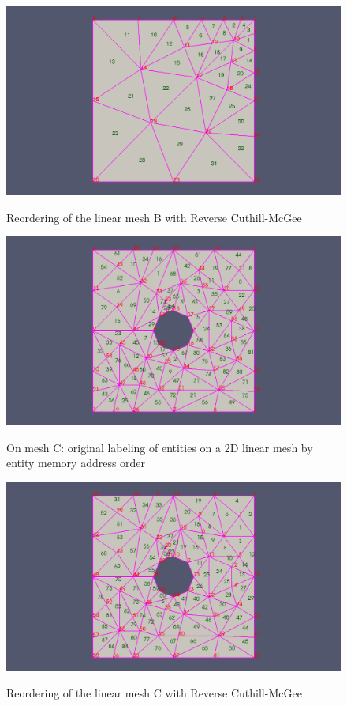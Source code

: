 \documentclass{article}
\begin{document}
\begin{figure}[h]
\caption{Reordering of the linear mesh B with Reverse Cuthill-McGee}
{\includegraphics[width = 15cm ]{post_b}}
\centering
\end{figure}


\begin{figure}[ht]
\caption{On mesh C: original labeling of entities on a 2D linear mesh by entity memory address order}
{\includegraphics[width = 15cm ]{pre_c}}
\centering
\end{figure}

\begin{figure}[h]
\caption{Reordering of the linear mesh C with Reverse Cuthill-McGee}
{\includegraphics[width = 15cm ]{post_c}}
\centering
\end{figure}
\end{document}

